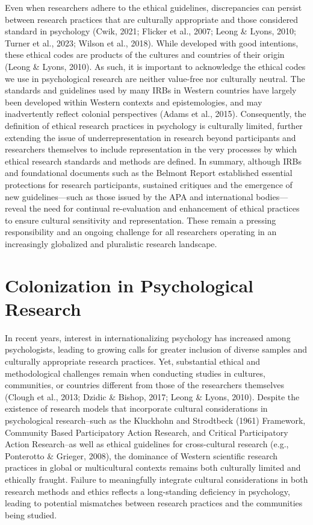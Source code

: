 \documentclass[
  11pt,
]{book}
\begin{document}
Even when researchers adhere to the ethical guidelines, discrepancies can persist between research practices that are culturally appropriate and those considered standard in psychology (Cwik, 2021; Flicker et al., 2007; Leong \& Lyons, 2010; Turner et al., 2023; Wilson et al., 2018). While developed with good intentions, these ethical codes are products of the cultures and countries of their origin (Leong \& Lyons, 2010). As such, it is important to acknowledge the ethical codes we use in psychological research are neither value-free nor culturally neutral. The standards and guidelines used by many IRBs in Western countries have largely been developed within Western contexts and epistemologies, and may inadvertently reflect colonial perspectives (Adams et al., 2015). Consequently, the definition of ethical research practices in psychology is culturally limited, further extending the issue of underrepresentation in research beyond participants and researchers themselves to include representation in the very processes by which ethical research standards and methods are defined. In summary, although IRBs and foundational documents such as the Belmont Report established essential protections for research participants, sustained critiques and the emergence of new guidelines---such as those issued by the APA and international bodies---reveal the need for continual re-evaluation and enhancement of ethical practices to ensure cultural sensitivity and representation. These remain a pressing responsibility and an ongoing challenge for all researchers operating in an increasingly globalized and pluralistic research landscape.

\section{Colonization in Psychological Research}\label{colonization-in-psychological-research}

In recent years, interest in internationalizing psychology has increased among psychologists, leading to growing calls for greater inclusion of diverse samples and culturally appropriate research practices. Yet, substantial ethical and methodological challenges remain when conducting studies in cultures, communities, or countries different from those of the researchers themselves (Clough et al., 2013; Dzidic \& Bishop, 2017; Leong \& Lyons, 2010). Despite the existence of research models that incorporate cultural considerations in psychological research--such as the Kluckhohn and Strodtbeck (1961) Framework, Community Based Participatory Action Research, and Critical Participatory Action Research--as well as ethical guidelines for cross-cultural research (e.g., Ponterotto \& Grieger, 2008), the dominance of Western scientific research practices in global or multicultural contexts remains both culturally limited and ethically fraught. Failure to meaningfully integrate cultural considerations in both research methods and ethics reflects a long-standing deficiency in psychology, leading to potential mismatches between research practices and the communities being studied.
\end{document}
